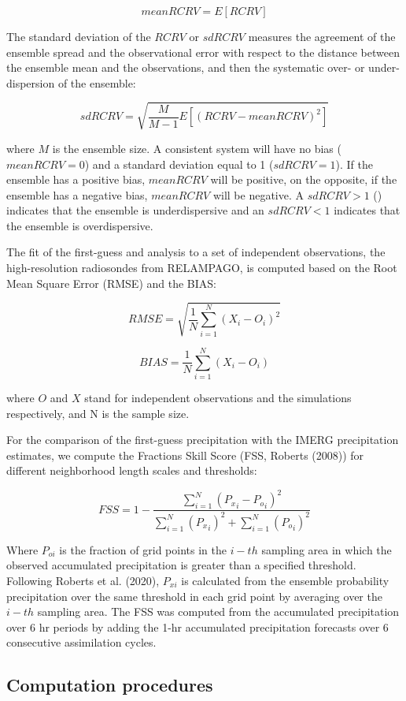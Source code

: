 \documentclass[authoryear,preprint,review,12pt]{elsarticle} %
\begin{document}
\[\mathit{mean RCRV} = E[RCRV]\]

The standard deviation of the \(RCRV\) or \(sd RCRV\) measures the agreement of the ensemble spread and the observational error with respect to the distance between the ensemble mean and the observations, and then the systematic over- or under- dispersion of the ensemble:

\[\mathit{sd RCRV} = \sqrt{\frac{M}{M -1}E[(\mathit{RCRV} - \mathit{mean RCRV})^2]}\]

where \(M\) is the ensemble size. A consistent system will have no bias (\(mean RCRV = 0\)) and a standard deviation equal to 1 (\(sd RCRV = 1\)). If the ensemble has a positive bias, \(mean RCRV\) will be positive, on the opposite, if the ensemble has a negative bias, \(mean RCRV\) will be negative. A \(sd RCRV > 1\) () indicates that the ensemble is underdispersive and an \(sd RCRV < 1\) indicates that the ensemble is overdispersive.

The fit of the first-guess and analysis to a set of independent observations, the high-resolution radiosondes from RELAMPAGO, is computed based on the Root Mean Square Error (RMSE) and the BIAS:

\[\mathit{RMSE} = \sqrt{\frac{1}{N}\sum_{i = 1}^{N} (X_i - O_i)^{2}}\]

\[\mathit{BIAS} = \frac{1}{N}\sum_{i = 1}^{N} (X_i - O_i)\]

where \(O\) and \(X\) stand for independent observations and the simulations respectively, and N is the sample size.

For the comparison of the first-guess precipitation with the IMERG precipitation estimates, we compute the Fractions Skill Score (FSS, Roberts (2008)) for different neighborhood length scales and thresholds:

\[\mathit{FSS} = 1-\frac{\sum_{i=1}^{N} ({P_x}_i-{P_o}_i)^{2}}{\sum_{i=1}^{N} ({P_x}_i)^{2}+\sum_{i=1}^{N} ({P_o}_i)^{2}} \]

Where \(P_{oi}\) is the fraction of grid points in the \(i-th\) sampling area in which the observed accumulated precipitation is greater than a specified threshold. Following Roberts et al. (2020), \(P_{xi}\) is calculated from the ensemble probability precipitation over the same threshold in each grid point by averaging over the \(i-th\) sampling area.
The FSS was computed from the accumulated precipitation over 6 hr periods by adding the 1-hr accumulated precipitation forecasts over 6 consecutive assimilation cycles.

\hypertarget{computation-procedures}{%
\subsection{Computation procedures}\label{computation-procedures}}
\end{document}
